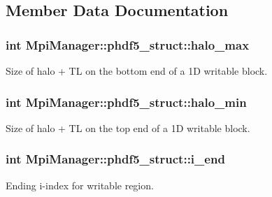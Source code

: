 \subsection{Member Data Documentation}
\subsubsection[{\texorpdfstring{halo\+\_\+max}{halo_max}}]{\setlength{\rightskip}{0pt plus 5cm}int Mpi\+Manager\+::phdf5\+\_\+struct\+::halo\+\_\+max}\hypertarget{struct_mpi_manager_1_1phdf5__struct_af6509514433ef18c04217b54ce4614a0}{}\label{struct_mpi_manager_1_1phdf5__struct_af6509514433ef18c04217b54ce4614a0}


Size of halo + TL on the bottom end of a 1D writable block. 

\subsubsection[{\texorpdfstring{halo\+\_\+min}{halo_min}}]{\setlength{\rightskip}{0pt plus 5cm}int Mpi\+Manager\+::phdf5\+\_\+struct\+::halo\+\_\+min}\hypertarget{struct_mpi_manager_1_1phdf5__struct_a1ea3307d7dac34273ee8a7b1014273fe}{}\label{struct_mpi_manager_1_1phdf5__struct_a1ea3307d7dac34273ee8a7b1014273fe}


Size of halo + TL on the top end of a 1D writable block. 

\subsubsection[{\texorpdfstring{i\+\_\+end}{i_end}}]{\setlength{\rightskip}{0pt plus 5cm}int Mpi\+Manager\+::phdf5\+\_\+struct\+::i\+\_\+end}\hypertarget{struct_mpi_manager_1_1phdf5__struct_a28567c9488624c7de401c9ee5c5fa13e}{}\label{struct_mpi_manager_1_1phdf5__struct_a28567c9488624c7de401c9ee5c5fa13e}


Ending i-\/index for writable region. 

